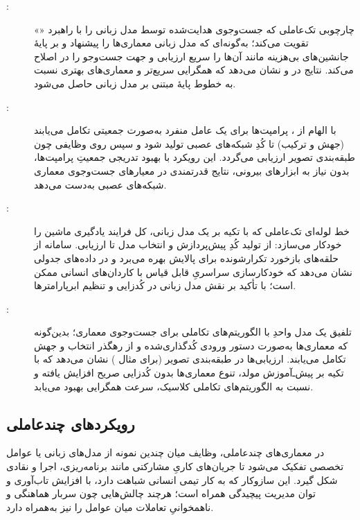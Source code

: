 \begin{description}
    \item[\cite{ji2025RZNAS}:]
          چارچوبی تک‌عاملی که جست‌وجوی هدایت‌شده توسط مدل زبانی را با راهبرد «» تقویت می‌کند؛ به‌گونه‌ای که مدل زبانی معماری‌ها را پیشنهاد و بر پایهٔ جانشین‌های بی‌هزینه مانند  آن‌ها را سریع ارزیابی و جهت جست‌وجو را در  اصلاح می‌کند. نتایج در  و  نشان می‌دهد که همگرایی سریع‌تر و معماری‌های بهتری نسبت به خطوط پایهٔ مبتنی بر مدل زبانی حاصل می‌شود.

    \item[\cite{chen2023Evoprompting}:]
          با الهام از ، پرامپت‌ها برای یک عامل منفرد به‌صورت جمعیتی تکامل می‌یابند (جهش و ترکیب) تا کُدِ شبکه‌های عصبی تولید شود و سپس روی وظایفی چون طبقه‌بندی تصویر ارزیابی می‌گردد. این رویکرد با بهبود تدریجی جمعیتِ پرامپت‌ها، بدون نیاز به ابزارهای بیرونی، نتایج قدرتمندی در معیارهای جست‌وجوی معماری شبکه‌های عصبی به‌دست می‌دهد.

    \item[\cite{zhang2023AutomlGPTAutomaticMachineLearning}:]
          خط لوله‌ای تک‌عاملی که با تکیه بر یک مدل زبانی، کل فرایند یادگیری ماشین را خودکار می‌سازد: از تولید کُدِ پیش‌پردازش و انتخاب مدل تا ارزیابی. سامانه از حلقه‌های بازخورد تکرارشونده برای پالایش بهره می‌برد و در داده‌های جدولی نشان می‌دهد که خودکارسازی سراسریِ قابل قیاس با کاردان‌های انسانی ممکن است؛ با تأکید بر نقش مدل زبانی در کُدزایی و تنظیم ابرپارامترها.

    \item[\cite{Yu2025GPTNAS}:]
          تلفیق یک مدل واحدِ  با الگوریتم‌های تکاملی برای جست‌وجوی معماری؛ بدین‌گونه که معماری‌ها به‌صورت دستور ورودی کُدگذاری‌شده و از رهگذر انتخاب و جهش تکامل می‌یابند. ارزیابی‌ها در طبقه‌بندی تصویر (برای مثال ) نشان می‌دهد که با تکیه بر پیش‌ـ‌آموزش مولد، تنوع معماری‌ها بدون کُدزایی صریح افزایش یافته و نسبت به الگوریتم‌های تکاملی کلاسیک، سرعت همگرایی بهبود می‌یابد.
\end{description}

\subsection{رویکردهای چندعاملی}
در معماری‌های چندعاملی، وظایف میان چندین نمونه از مدل‌های زبانی یا عوامل تخصصی تفکیک می‌شود تا جریان‌های کاریِ مشارکتی مانند برنامه‌ریزی، اجرا و نقادی شکل گیرد. این سازوکار که به کار تیمی انسانی شباهت دارد، با افزایش تاب‌آوری و توان مدیریت پیچیدگی همراه است؛ هرچند چالش‌هایی چون سربار هماهنگی و ناهمخوانیِ تعاملات میان عوامل را نیز به‌همراه دارد.

